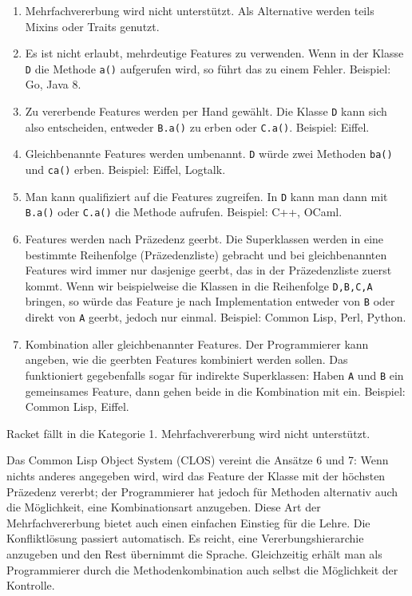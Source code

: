 \begin{enumerate}
 \item Mehrfachvererbung wird nicht unterstützt. Als Alternative werden teils Mixins oder Traits genutzt.
 \item Es ist nicht erlaubt, mehrdeutige Features zu verwenden. Wenn in der Klasse \texttt{D} die Methode \texttt{a()} aufgerufen wird, so führt das zu einem Fehler. Beispiel: Go, Java 8.
 \item Zu vererbende Features werden per Hand gewählt. Die Klasse \texttt{D} kann sich also entscheiden, entweder \texttt{B.a()} zu erben oder \texttt{C.a()}. Beispiel: Eiffel.
 \item Gleichbenannte Features werden umbenannt. \texttt{D} würde zwei Methoden \texttt{ba()} und \texttt{ca()} erben. Beispiel: Eiffel, Logtalk.
 \item Man kann qualifiziert auf die Features zugreifen. In \texttt{D} kann man dann mit \texttt{B.a()} oder \texttt{C.a()} die Methode aufrufen. Beispiel: C++, OCaml.
 \item Features werden nach Präzedenz geerbt. Die Superklassen werden in eine bestimmte Reihenfolge (Präzedenzliste) gebracht und bei gleichbenannten Features wird immer nur dasjenige geerbt, das in der Präzedenzliste zuerst kommt. Wenn wir beispielweise die Klassen in die Reihenfolge \texttt{D,B,C,A} bringen, so würde das Feature je nach Implementation entweder von \texttt{B} oder direkt von \texttt{A} geerbt, jedoch nur einmal. Beispiel: Common Lisp, Perl, Python.
 \item Kombination aller gleichbenannter Features. Der Programmierer kann angeben, wie die geerbten Features kombiniert werden sollen. Das funktioniert gegebenfalls sogar für indirekte Superklassen: Haben \texttt{A} und \texttt{B} ein gemeinsames Feature, dann gehen beide in die Kombination mit ein. Beispiel: Common Lisp, Eiffel.
\end{enumerate}


Racket fällt in die Kategorie 1. Mehrfachvererbung wird nicht unterstützt.

Das Common Lisp Object System (CLOS) vereint die Ansätze 6 und 7: Wenn nichts anderes angegeben wird, wird das Feature der Klasse mit der höchsten Präzedenz vererbt; der Programmierer hat jedoch für Methoden alternativ auch die Möglichkeit, eine Kombinationsart anzugeben. Diese Art der Mehrfachvererbung bietet auch einen einfachen Einstieg für die Lehre. Die Konfliktlösung passiert automatisch. Es reicht, eine Vererbungshierarchie anzugeben und den Rest übernimmt die Sprache. Gleichzeitig erhält man als Programmierer durch die Methodenkombination auch selbst die Möglichkeit der Kontrolle.

